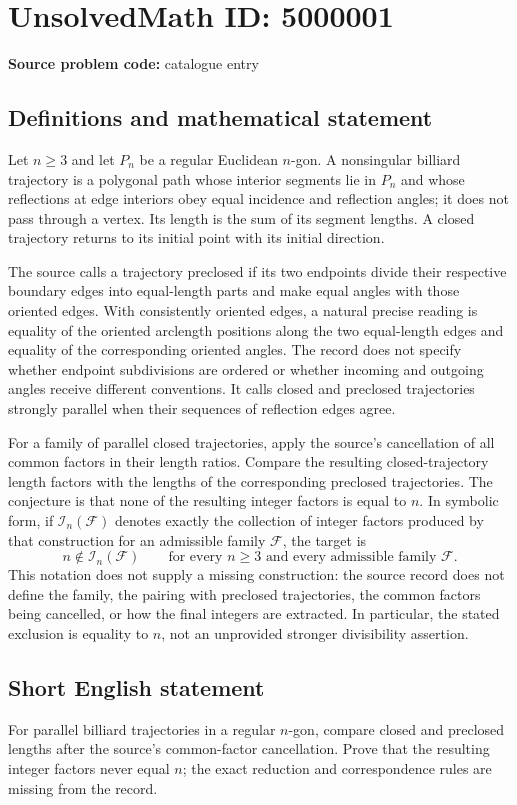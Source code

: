 \documentclass[11pt]{article}
\begin{document}
\section*{UnsolvedMath ID: 5000001}
\textbf{Source problem code:} catalogue entry
\subsection{Definitions and mathematical statement}
Let $n\geq3$ and let $P_n$ be a regular Euclidean $n$-gon. A nonsingular billiard trajectory is a polygonal path whose interior segments lie in $P_n$ and whose reflections at edge interiors obey equal incidence and reflection angles; it does not pass through a vertex. Its length is the sum of its segment lengths. A closed trajectory returns to its initial point with its initial direction.

The source calls a trajectory preclosed if its two endpoints divide their respective boundary edges into equal-length parts and make equal angles with those oriented edges. With consistently oriented edges, a natural precise reading is equality of the oriented arclength positions along the two equal-length edges and equality of the corresponding oriented angles. The record does not specify whether endpoint subdivisions are ordered or whether incoming and outgoing angles receive different conventions. It calls closed and preclosed trajectories strongly parallel when their sequences of reflection edges agree.

For a family of parallel closed trajectories, apply the source's cancellation of all common factors in their length ratios. Compare the resulting closed-trajectory length factors with the lengths of the corresponding preclosed trajectories. The conjecture is that none of the resulting integer factors is equal to $n$. In symbolic form, if $\mathcal I_n(\mathcal F)$ denotes exactly the collection of integer factors produced by that construction for an admissible family $\mathcal F$, the target is
\[
n\notin\mathcal I_n(\mathcal F)\qquad\text{for every }n\geq3\text{ and every admissible family }\mathcal F.
\]
This notation does not supply a missing construction: the source record does not define the family, the pairing with preclosed trajectories, the common factors being cancelled, or how the final integers are extracted. In particular, the stated exclusion is equality to $n$, not an unprovided stronger divisibility assertion.
\subsection{Short English statement}
For parallel billiard trajectories in a regular $n$-gon, compare closed and preclosed lengths after the source's common-factor cancellation. Prove that the resulting integer factors never equal $n$; the exact reduction and correspondence rules are missing from the record.
\end{document}
